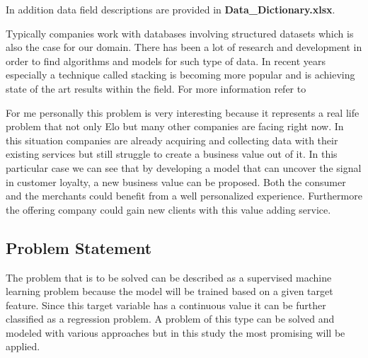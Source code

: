 \documentclass{article}
\begin{document}
In addition data field descriptions are provided in \textbf{Data\_Dictionary.xlsx}.

Typically companies work with databases involving structured datasets which is also the case for our domain. There has been a lot of research and development in order to find algorithms and models for such type of data. In recent years especially a technique called stacking is becoming more popular and is achieving state of the art results within the field. For more information refer to \cite{stacked,regression, super, scale}

For me personally this problem is very interesting because it represents a real life problem that not only Elo but many other companies are facing right now. In this situation companies are already acquiring and collecting data with their existing services but still struggle to create a business value out of it. In this particular case we can see that by developing a model that can uncover the signal in customer loyalty, a new business value can be proposed. Both the consumer and the merchants could benefit from a well personalized experience. Furthermore the offering company could gain new clients with this value adding service.



\subsection{Problem Statement}



The problem that is to be solved can be described as a supervised machine learning problem because the model will be trained based on a given target feature. Since this target variable has a continuous value it can be further classified as a regression problem. A problem of this type can be solved and modeled with various approaches but in this study the most promising will be applied.
\end{document}
